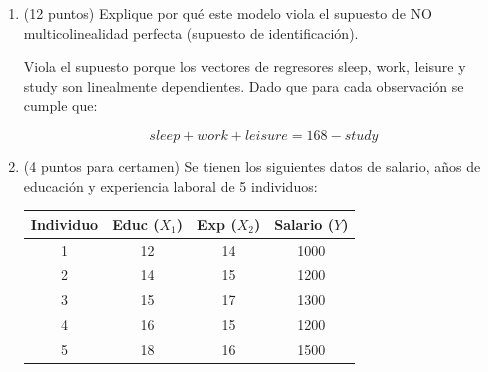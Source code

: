 \documentclass[10pt,a4paper]{article}
\begin{document}
\begin{enumerate}
\begin{enumerate}
{\color{blue} No, tiene sentido porque no se pueden mantener constantes los tiempos dedicados a todas las otras actividades y modificar study. Dado que las 4 actividades representan el 100\% del tiempo de los individuos.}
\item (12 puntos) Explique por qué este modelo viola el supuesto de NO multicolinealidad perfecta (supuesto de identificación).

{\color{blue}Viola el supuesto porque los vectores de regresores sleep, work, leisure y  study son linealmente dependientes. Dado que para cada observación se cumple que:

$$sleep + work + leisure=168- study$$}



\item (4 puntos para certamen) Se tienen los siguientes datos de salario, años de educación y experiencia laboral de 5 individuos:
\begin{center}
\begin{tabular}{|c|c|c|c|}
\hline
\textbf{Individuo} & \textbf{Educ} ($X_1$) & \textbf{Exp} ($X_2$)  & \textbf{Salario ($Y$)}\\
\hline
1 & 12 & 14 & 1000 \\
2 & 14 & 15 & 1200 \\
3 & 15 & 17 & 1300 \\
4 & 16 & 15 & 1200 \\
5 & 18 & 16 & 1500 \\
\hline
\end{tabular}
\end{center}


\end{enumerate}
\end{enumerate}
\end{document}
